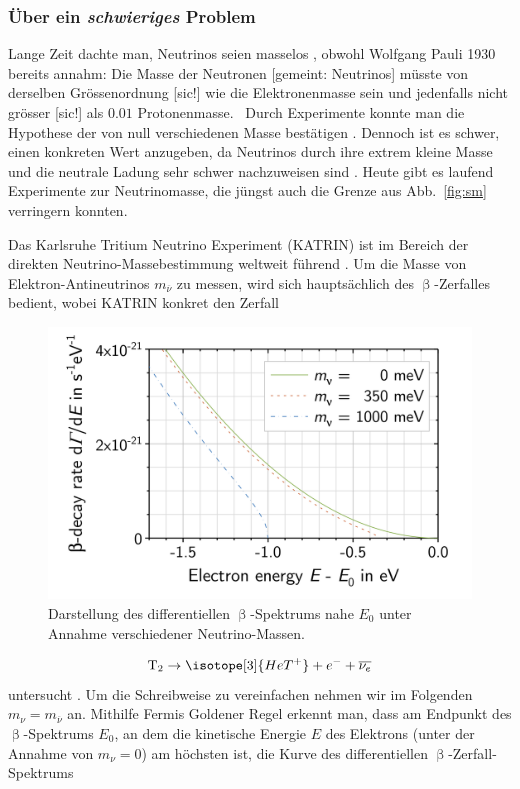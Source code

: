 \documentclass[a4paper,12pt]{article}
\newcommand{\figref}[1]{Abb.~\ref{#1}}
\begin{document}
\subsubsection{Über ein \emph{schwieriges} Problem} \label{sssec:222}
Lange Zeit dachte man, Neutrinos seien masselos \cite[26]{Athar2020}, obwohl Wolfgang Pauli 1930 bereits annahm: \glqq Die Masse der Neutronen [gemeint: Neutrinos] müsste von derselben Grössenordnung [sic!] wie die Elektronenmasse sein und jedenfalls nicht grösser [sic!] als $\num{0,01}$ Protonenmasse.\grqq \ \cite[2]{Pauli} Durch Experimente konnte man die Hypothese der von null verschiedenen Masse bestätigen \cite[300]{Zyla2020}. Dennoch ist es schwer, einen konkreten Wert anzugeben, da Neutrinos durch ihre extrem kleine Masse und die neutrale Ladung sehr schwer nachzuweisen sind \cite{Dolan2025}. Heute gibt es laufend Experimente zur Neutrinomasse, die jüngst auch die Grenze aus \figref{fig:sm} verringern konnten. \par 
Das Karlsruhe Tritium Neutrino Experiment (KATRIN) ist im Bereich der direkten Neutrino-Massebestimmung weltweit führend \cite[180]{Aker2025}. Um die Masse von Elektron-Antineutrinos $m_{\overline{\nu}}$ zu messen, wird sich hauptsächlich des $\upbeta$-Zerfalles bedient, wobei KATRIN konkret den Zerfall
\begin{figure}[b!]
\centering
\includegraphics[width=.7\textwidth]{Endpoint}
\caption[Darstellung des differentiellen $\upbeta$-Spektrums nahe $E_0$ unter Annahme verschiedener Neutrino-Massen. -- Quelle: {\cite[][3]{Kleesiek2019}}]{Darstellung des differentiellen $\upbeta$-Spektrums nahe $E_0$ unter Annahme verschiedener Neutrino-Massen.}
\label{fig:endpoint}
\end{figure} 
\begin{equation}
\mathrm{T_2}\rightarrow \isotope[3]{HeT^+} + e^-+\overline{\nu_e}
\label{eq:tritzerfall}
\end{equation}
untersucht \cite[072004-2]{Aker2022}. Um die Schreibweise zu vereinfachen nehmen wir im Folgenden $m_{\nu}=m_{\overline{\nu}}$ an. Mithilfe Fermis Goldener Regel \cite[2]{Kleesiek2019} erkennt man, dass am Endpunkt des $\upbeta$-Spektrums $E_0$, an dem die kinetische Energie $E$ des Elektrons (unter der Annahme von $m_\nu=0$) am höchsten ist, die Kurve des differentiellen $\upbeta$-Zerfall-Spektrums 
\end{document}
